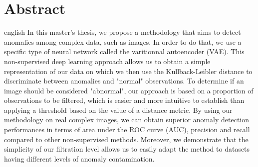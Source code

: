 \chapter*{Abstract}             %
\label{chap:abstract}           %

\begin{otherlanguage*}{english}
In this master's thesis, we propose a methodology that aims to detect anomalies among complex data, such as images. In order to do that, we use a specific type of neural network called the varitionnal autoencoder (VAE). This non-supervised deep learning approach allows us to obtain a simple representation of our data on which we then use the Kullback-Leibler distance to discriminate between anomalies and "normal" observations. To determine if an image should be considered "abnormal", our approach is based on a proportion of observations to be filtered, which is easier and more intuitive to establish than applying a threshold based on the value of a distance metric. By using our methodology on real complex images, we can obtain superior anomaly detection performances in terms of area under the ROC curve (AUC), precision and recall compared to other non-supervised methods. Moreover, we demonstrate that the simplicity of our filtration level allows us to easily adapt the method to datasets having different levels of anomaly contamination.
\end{otherlanguage*}